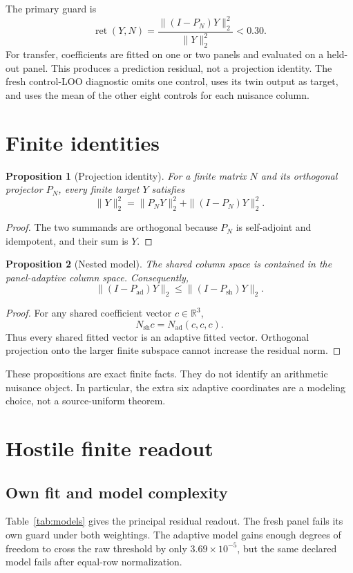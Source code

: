 \documentclass[10pt]{article}
\newtheorem{proposition}{Proposition}
\newcommand{\RR}{\mathbb{R}}
\newcommand{\ret}{\operatorname{ret}}
\begin{document}
The primary guard is
\[
 \ret(Y,N)=\frac{\|(I-P_N)Y\|_2^2}{\|Y\|_2^2}<0.30.
\]
For transfer, coefficients are fitted on one or two panels and evaluated on
a held-out panel.  This produces a prediction residual, not a projection
identity.  The fresh control-LOO diagnostic omits one control, uses its twin
output as target, and uses the mean of the other eight controls for each
nuisance column.

\section{Finite identities}

\begin{proposition}[Projection identity]
For a finite matrix $N$ and its orthogonal projector $P_N$, every finite
target $Y$ satisfies
\[
 \|Y\|_2^2=\|P_NY\|_2^2+\|(I-P_N)Y\|_2^2.
\]
\end{proposition}
\begin{proof}
The two summands are orthogonal because $P_N$ is self-adjoint and idempotent,
and their sum is $Y$.
\end{proof}

\begin{proposition}[Nested model]
The shared column space is contained in the panel-adaptive column space.
Consequently,
\[
 \|(I-P_{\mathrm{ad}})Y\|_2
 \leq \|(I-P_{\mathrm{sh}})Y\|_2.
\]
\end{proposition}
\begin{proof}
For any shared coefficient vector $c\in\RR^3$,
\[
 N_{\mathrm{sh}}c=N_{\mathrm{ad}}(c,c,c).
\]
Thus every shared fitted vector is an adaptive fitted vector.  Orthogonal
projection onto the larger finite subspace cannot increase the residual norm.
\end{proof}

These propositions are exact finite facts.  They do not identify an
arithmetic nuisance object.  In particular, the extra six adaptive
coordinates are a modeling choice, not a source-uniform theorem.

\section{Hostile finite readout}

\subsection{Own fit and model complexity}

Table~\ref{tab:models} gives the principal residual readout.  The fresh
panel fails its own guard under both weightings.  The adaptive model gains
enough degrees of freedom to cross the raw threshold by only
$3.69\times 10^{-5}$, but the same declared model fails after equal-row
normalization.
\end{document}
